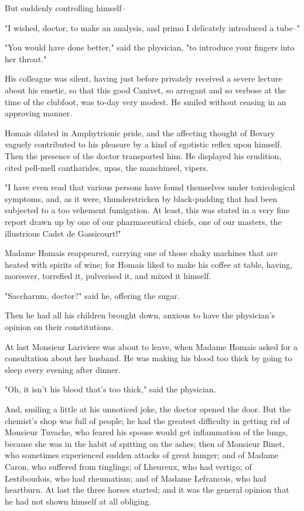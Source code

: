 \documentclass[11pt,twocolumn]{ltugboat}
\begin{document}
But suddenly controlling himself--

"I wished, doctor, to make an analysis, and primo I delicately
introduced a tube--"

"You would have done better," said the physician, "to introduce your
fingers into her throat."

His colleague was silent, having just before privately received a severe
lecture about his emetic, so that this good Canivet, so arrogant and so
verbose at the time of the clubfoot, was to-day very modest. He smiled
without ceasing in an approving manner.

Homais dilated in Amphytrionic pride, and the affecting thought of
Bovary vaguely contributed to his pleasure by a kind of egotistic
reflex upon himself. Then the presence of the doctor transported him.
He displayed his erudition, cited pell-mell cantharides, upas, the
manchineel, vipers.

"I have even read that various persons have found themselves
under toxicological symptoms, and, as it were, thunderstricken by
black-pudding that had been subjected to a too vehement fumigation.
At least, this was stated in a very fine report drawn up by one of our
pharmaceutical chiefs, one of our masters, the illustrious Cadet de
Gassicourt!"

Madame Homais reappeared, carrying one of those shaky machines that
are heated with spirits of wine; for Homais liked to make his coffee
at table, having, moreover, torrefied it, pulverised it, and mixed it
himself.

"Saccharum, doctor?" said he, offering the sugar.

Then he had all his children brought down, anxious to have the
physician's opinion on their constitutions.

At last Monsieur Lariviere was about to leave, when Madame Homais asked
for a consultation about her husband. He was making his blood too thick
by going to sleep every evening after dinner.

"Oh, it isn't his blood that's too thick," said the physician.

And, smiling a little at his unnoticed joke, the doctor opened the
door. But the chemist's shop was full of people; he had the greatest
difficulty in getting rid of Monsieur Tuvache, who feared his spouse
would get inflammation of the lungs, because she was in the habit of
spitting on the ashes; then of Monsieur Binet, who sometimes experienced
sudden attacks of great hunger; and of Madame Caron, who suffered
from tinglings; of Lheureux, who had vertigo; of Lestiboudois, who had
rheumatism; and of Madame Lefrancois, who had heartburn. At last the
three horses started; and it was the general opinion that he had not
shown himself at all obliging.
\end{document}
